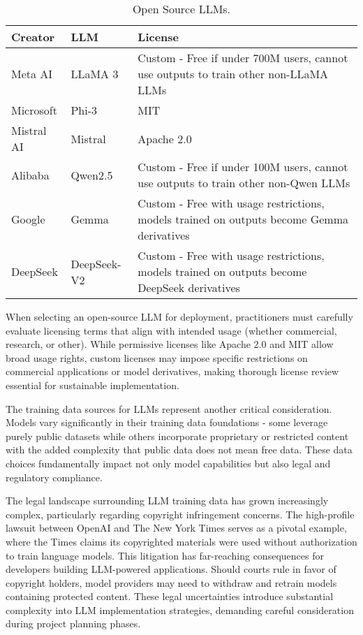 \begin{table}[H]
\centering
\caption{Open Source LLMs.}
\label{tab:open_source_llms}
\begin{tabular}{lll}
\hline
Creator & LLM & License \\
\hline
Meta AI & LLaMA 3 & Custom - Free if under 700M users, cannot use outputs to train other non-LLaMA LLMs \\
Microsoft & Phi-3 & MIT \\
Mistral AI & Mistral & Apache 2.0 \\
Alibaba & Qwen2.5 & Custom - Free if under 100M users, cannot use outputs to train other non-Qwen LLMs \\
Google & Gemma & Custom - Free with usage restrictions, models trained on outputs become Gemma derivatives \\
DeepSeek & DeepSeek-V2 & Custom - Free with usage restrictions, models trained on outputs become DeepSeek derivatives \\
\hline
\end{tabular}
\end{table}

When selecting an open-source LLM for deployment, practitioners must carefully evaluate licensing terms that align with intended usage (whether commercial, research, or other). While permissive licenses like Apache 2.0 and MIT allow broad usage rights, custom licenses may impose specific restrictions on commercial applications or model derivatives, making thorough license review essential for sustainable implementation.

The training data sources for LLMs represent another critical consideration. Models vary significantly in their training data foundations - some leverage purely public datasets while others incorporate proprietary or restricted content with the added complexity that public data does not mean free data. These data choices fundamentally impact not only model capabilities but also legal and regulatory compliance.

The legal landscape surrounding LLM training data has grown increasingly complex, particularly regarding copyright infringement concerns. The high-profile lawsuit between OpenAI and The New York Times  serves as a pivotal example, where the Times claims its copyrighted materials were used without authorization to train language models. This litigation has far-reaching consequences for developers building LLM-powered applications. Should courts rule in favor of copyright holders, model providers may need to withdraw and retrain models containing protected content. These legal uncertainties introduce substantial complexity into LLM implementation strategies, demanding careful consideration during project planning phases.

